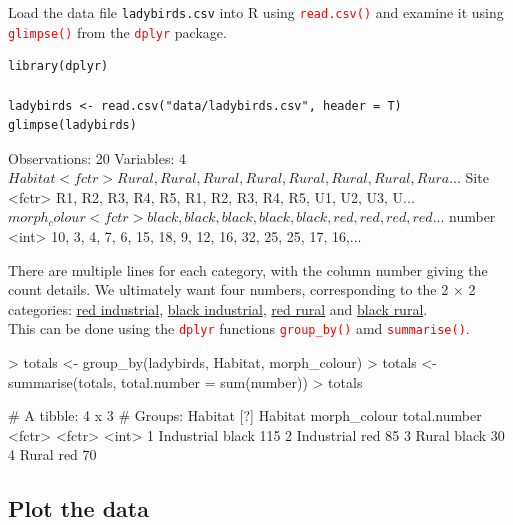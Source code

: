 \documentclass[a4paper,12pt]{article}
\newcommand\code[1]{\textcolor{red}{\texttt{#1}}}
\begin{document}
Load the data file \texttt{ladybirds.csv} into R using \code{read.csv()} and examine it using \code{glimpse()} from the \code{dplyr} package.

\begin{shaded}
\begin{verbatim}
library(dplyr)

ladybirds <- read.csv("data/ladybirds.csv", header = T)
glimpse(ladybirds)
\end{verbatim}
\end{shaded}

\begin{Schunk}
\begin{Soutput}
Observations: 20
Variables: 4
$ Habitat      <fctr> Rural, Rural, Rural, Rural, Rural, Rural, Rural, Rura...
$ Site         <fctr> R1, R2, R3, R4, R5, R1, R2, R3, R4, R5, U1, U2, U3, U...
$ morph_colour <fctr> black, black, black, black, black, red, red, red, red...
$ number       <int> 10, 3, 4, 7, 6, 15, 18, 9, 12, 16, 32, 25, 25, 17, 16,...
\end{Soutput}
\end{Schunk}

There are multiple lines for each category, with the column number giving the count details. We ultimately want four numbers, corresponding to the 2 $\times$ 2 categories: \underline{red industrial}, \underline{black industrial}, \underline{red rural} and \underline{black rural}. \\

This can be done using the \code{dplyr} functions \code{group\_by()} amd \code{summarise()}.

\begin{shaded}
\begin{Schunk}
\begin{Sinput}
> totals <- group_by(ladybirds, Habitat, morph_colour)
> totals <- summarise(totals, total.number = sum(number))
> totals
\end{Sinput}
\begin{Soutput}
# A tibble: 4 x 3
# Groups:   Habitat [?]
     Habitat morph_colour total.number
      <fctr>       <fctr>        <int>
1 Industrial        black          115
2 Industrial          red           85
3      Rural        black           30
4      Rural          red           70
\end{Soutput}
\end{Schunk}
\end{shaded}

\subsection{Plot the data}
\end{document}
